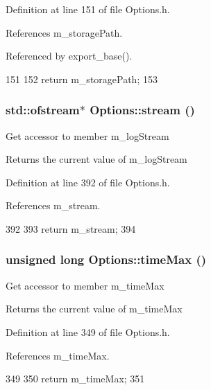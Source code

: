 Definition at line 151 of file Options.h.

References m\_\-storagePath.

Referenced by export\_\-base().


\begin{DoxyCode}
151                                  {
152                 return m_storagePath;
153         }
\end{DoxyCode}
\hypertarget{classOptions_acfc9aa4c7dc41691571f2b37d3fe86af}{
\subsubsection[{stream}]{\setlength{\rightskip}{0pt plus 5cm}std::ofstream$\ast$ Options::stream ()}}
\label{classOptions_acfc9aa4c7dc41691571f2b37d3fe86af}
Get accessor to member m\_\-logStream \begin{DoxyReturn}{Returns}
the current value of m\_\-logStream 
\end{DoxyReturn}


Definition at line 392 of file Options.h.

References m\_\-stream.


\begin{DoxyCode}
392                                {
393                 return m_stream;
394         }
\end{DoxyCode}
\hypertarget{classOptions_a4569b8790af48109c8639bec7b626fa6}{
\subsubsection[{timeMax}]{\setlength{\rightskip}{0pt plus 5cm}unsigned long Options::timeMax ()}}
\label{classOptions_a4569b8790af48109c8639bec7b626fa6}
Get accessor to member m\_\-timeMax \begin{DoxyReturn}{Returns}
the current value of m\_\-timeMax 
\end{DoxyReturn}


Definition at line 349 of file Options.h.

References m\_\-timeMax.


\begin{DoxyCode}
349                                  {
350                 return m_timeMax;
351         }
\end{DoxyCode}



